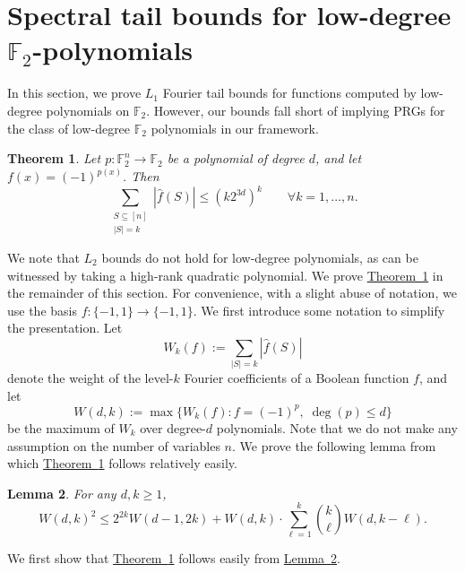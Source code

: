 \documentclass[11pt]{article}
\numberwithin{equation}{section}
\newtheorem{theorem}{Theorem}[section]
\newtheorem{lemma}[theorem]{Lemma}
\theoremstyle{definition}
\theoremstyle{plain}
\newcommand{\expref}[2]{\hyperref[#2]{#1~\ref{#2}}}
\newcommand{\F}{\mathbb{F}}
\begin{document}
\section{Spectral tail bounds for low-degree \texorpdfstring{$\F_2$}{F2}-polynomials}
\label{section:lowdegree_spectral}
In this section, we prove  $L_1$ Fourier tail bounds for functions computed by low-degree polynomials on $\F_2$. However, our bounds fall short of implying PRGs for the class of low-degree $\F_2$ polynomials in our framework.

\begin{theorem}
\label{thm:polynomialspectralnorm} Let $p:\F_2^n \to \F_2$ be a polynomial
of degree $d$, and let $f(x)=(-1)^{p(x)}$. Then
$$
\sum_{\substack{S\subseteq [n] \\ |S| = k }} |\widehat{f}(S)| \leq   (k2^{3d})^k \qquad \forall k=1,\ldots,n.
$$
\end{theorem}

We note that $L_2$ bounds do not hold for low-degree polynomials, as can be witnessed by taking a high-rank quadratic polynomial. We prove \expref{Theorem}{thm:polynomialspectralnorm} in the remainder of this section.
For convenience, with a slight abuse of notation, we use the basis $f:\{-1,1\}\rightarrow \{-1,1\}$.
We first introduce some notation to simplify the presentation. Let
$$
W_k(f) := \sum_{|S|=k} |\hat{f}(S)|
$$
denote the weight of the level-$k$ Fourier coefficients of a Boolean
function $f$, and let
$$
W(d,k) := \max \{W_k(f): f=(-1)^p, \; \deg(p) \le d\}
$$
be the maximum of $W_k$ over degree-$d$ polynomials. Note that we do not make any assumption on the number of variables $n$. We prove the following lemma from which \expref{Theorem}{thm:polynomialspectralnorm} follows relatively easily.
\begin{lemma}
\label{lemma:rec_poly} For any $d,k \ge 1$, $$ W(d,k)^{2} \le 2^{2k}W(d-1,2k) + W(d,k) \cdot \sum_{\ell=1}^{k} \binom{k}{\ell}   W(d, k -\ell).$$
\end{lemma}

We first show that \expref{Theorem}{thm:polynomialspectralnorm} follows easily from \expref{Lemma}{lemma:rec_poly}.
\end{document}
